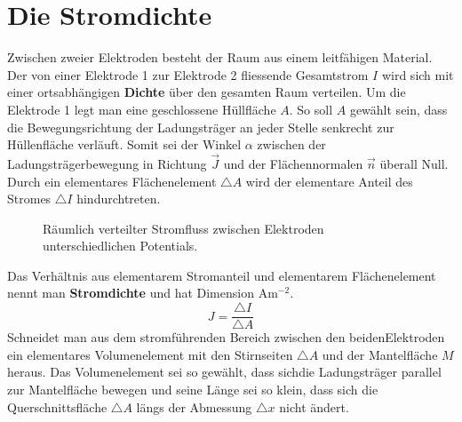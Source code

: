 \section{Die Stromdichte}
Zwischen zweier Elektroden besteht der Raum aus einem leitfähigen Material. Der von einer Elektrode 1 zur Elektrode 2 fliessende Gesamtstrom $I$ wird sich mit einer ortsabhängigen \textbf{Dichte} über den gesamten Raum verteilen. 
\newline\newline
Um die Elektrode 1 legt man eine geschlossene Hüllfläche $A$. So soll $A$ gewählt sein, dass die Bewegungsrichtung der Ladungsträger an jeder Stelle senkrecht zur Hüllenfläche verläuft. Somit sei der Winkel $\alpha$ zwischen der Ladungsträgerbewegung in Richtung $\overrightarrow{J}$ und der Flächennormalen $\overrightarrow{n}$ überall Null. Durch ein elementares Flächenelement $\triangle A$ wird der elementare Anteil des Stromes $\triangle I$ hindurchtreten. 
\begin{figure}[H]
\centering
\caption{Räumlich verteilter Stromfluss zwischen Elektroden unterschiedlichen Potentials.}
\label{fig_IIc}
\end{figure}
\noindent Das Verhältnis aus elementarem Stromanteil und elementarem Flächenelement nennt man \textbf{Stromdichte} und hat Dimension Am$^{-2}$.
\begin{equation}
\boxed{J=\dfrac{\triangle I}{\triangle A}}
\end{equation}
\noindent Schneidet man aus dem stromführenden Bereich zwischen den beidenElektroden ein elementares Volumenelement mit den Stirnseiten $\triangle A$ und der Mantelfläche $M$ heraus. Das Volumenelement sei so gewählt, dass sichdie Ladungsträger parallel zur Mantelfläche bewegen und seine Länge sei so klein, dass sich die Querschnittsfläche $\triangle A$ längs der Abmessung $\triangle x$ nicht ändert.
